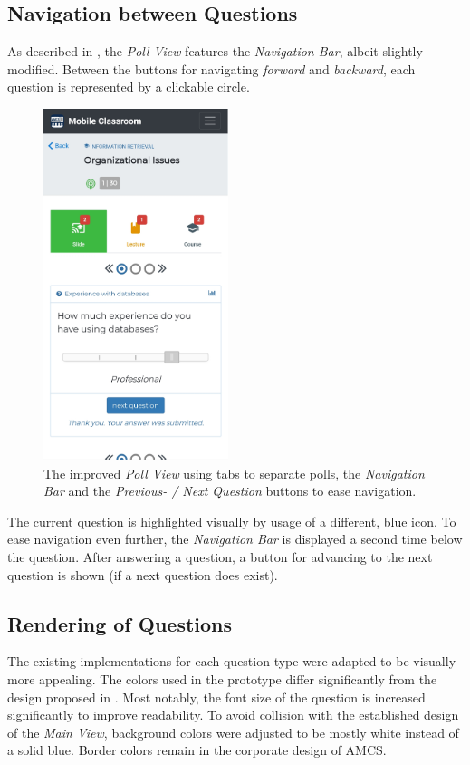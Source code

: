 \subsection{Navigation between Questions}
As described in , the \emph{Poll View} features the \emph{Navigation Bar}, albeit slightly modified. Between the buttons for navigating \emph{forward} and \emph{backward}, each question is represented by a clickable circle. 
\begin{figure}
	\vspace*{-0.5cm}
	\begin{center}
		\includegraphics[width=0.48\textwidth]{screenshots/redesign/poll_view_next_question}
	\end{center}
	\captionsetup{format=plain}
	\caption{The improved \emph{Poll View} using tabs to separate polls, the \emph{Navigation Bar} and the \emph{Previous- / Next Question} buttons to ease navigation.}
	\label{fig:pollview}
\end{figure}
The current question is highlighted visually by usage of a different, blue icon.
To ease navigation even further, the \emph{Navigation Bar} is displayed a second time below the question. After answering a question, a button for advancing to the next question is shown (if a next question does exist).
\subsection{Rendering of Questions}
The existing implementations for each question type were adapted to be visually more appealing. The colors used in the prototype differ significantly from the design proposed in . Most notably, the font size of the question is increased significantly to improve readability. To avoid collision with the established design of the \emph{Main View}, background colors were adjusted to be mostly white instead of a solid blue. Border colors remain in the corporate design of AMCS. 

